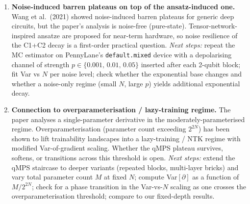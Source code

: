 \begin{enumerate}
\item \textbf{Noise-induced barren plateaus on top of the ansatz-induced one.} Wang et al.\ (2021) showed noise-induced barren plateaus for generic deep circuits, but the paper's analysis is noise-free (pure-state). Tensor-network-inspired ansatze are proposed for near-term hardware, so noise resilience of the C1+C2 decay is a first-order practical question. \emph{Next steps:} repeat the MC estimator on PennyLane's \texttt{default.mixed} device with a depolarising channel of strength $p \in \{0.001,\,0.01,\,0.05\}$ inserted after each 2-qubit block; fit Var vs $N$ per noise level; check whether the exponential base changes and whether a noise-only regime (small $N$, large $p$) yields additional exponential decay.

\item \textbf{Connection to overparameterisation / lazy-training regime.} The paper analyses a single-parameter derivative in the moderately-parameterised regime. Overparameterisation (parameter count exceeding $2^{2N}$) has been shown to lift trainability landscapes into a lazy-training / NTK regime with modified Var-of-gradient scaling. Whether the qMPS plateau survives, softens, or transitions across this threshold is open. \emph{Next steps:} extend the qMPS staircase to deeper variants (repeated blocks, multi-layer bricks) and vary total parameter count $M$ at fixed $N$; compute Var$[\partial]$ as a function of $M/2^{2N}$; check for a phase transition in the Var-vs-$N$ scaling as one crosses the overparameterisation threshold; compare to our fixed-depth results.

\end{enumerate}
